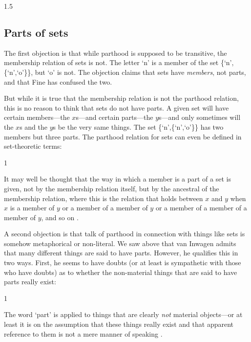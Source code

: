 \documentclass[11pt]{article}
\newenvironment{squote}{%
\begin{spacing}{1}
\begin{list}{}{%
\setlength{\labelwidth}{0pt}%
\rightmargin\leftmargin%
}
\item\relax
}{%
\end{list}%
\end{spacing}
}
\begin{document}
\begin{spacing}{1.5}
\subsection{Parts of sets}
\label{sets}
The first objection is that while parthood is supposed to be
transitive, the membership relation of sets is not.  The letter `n' is
a member of the set \{`n',\{`n',`o'\}\}, but `o' is not.  The
objection claims that sets have {\em members}, not parts, and that
Fine has confused the two.

But while it is true that the membership relation is not the parthood
relation, this is no reason to think that sets do not have parts.  A
given set will have certain members---the $x$s---and certain
parts---the $y$s---and only sometimes will the $x$s and the $y$s be
the very same things.  The set \{`n',\{`n',`o'\}\} has two members
but three parts.  The parthood relation for sets can even be defined
in set-theoretic terms:

\begin{squote}
It may well be thought that the way in which a member is a part of a
set is given, not by the membership relation itself, but by the
ancestral of the membership relation, where this is the relation that
holds between $x$ and $y$ when $x$ is a member of $y$ or a member of a
member of $y$ or a member of a member of a member of $y$, and so on
\citep[563]{fine2010}.
\end{squote}

A second objection is that talk of parthood in connection with things
like sets is somehow metaphorical or non-literal.  We saw above that
van Inwagen admits that many different things are said to have parts.
However, he qualifies this in two ways.  First, he seems to have
doubts (or at least is sympathetic with those who have doubts) as to
whether the non-material things that are said to have parts really
exist:

\begin{squote}
The word `part' is applied to things that are clearly \emph{not}
material objects---or at least it is on the assumption that these
things really exist and that apparent reference to them is not a mere
manner of speaking \citep[19]{inwagen1995}.
\end{squote}


\end{spacing}
\end{document}
